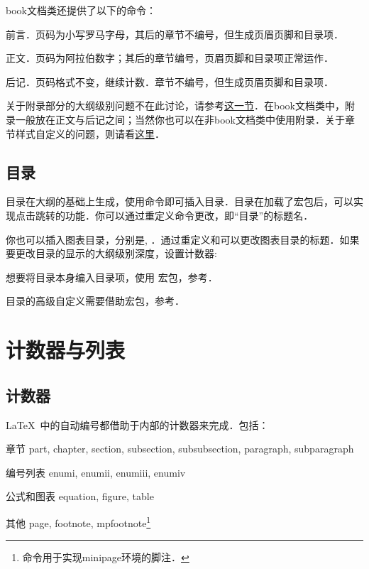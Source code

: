 book文档类还提供了以下的命令：
\begin{para}
\item[\latexline{frontmatter}] 前言．页码为小写罗马字母，其后的章节不编号，但生成页眉页脚和目录项．
\item[\latexline{mainmatter}] 正文．页码为阿拉伯数字；其后的章节编号，页眉页脚和目录项正常运作．
\item[\latexline{backmatter}] 后记．页码格式不变，继续计数．章节不编号，但生成页眉页脚和目录项．
\end{para}

关于附录部分的大纲级别问题不在此讨论，请参考\hyperref[sec:appendix]{这一节}．在book文档类中，附录一般放在正文与后记之间；当然你也可以在非book文档类中使用附录．关于章节样式自定义的问题，则请看\hyperref[sec:titlesec]{这里}．

\subsection{目录}
目录在大纲的基础上生成，使用命令即可插入目录．目录在加载了宏包后，可以实现点击跳转的功能．你可以通过重定义命令更改，即“目录”的标题名．
\begin{latex}
\renewcommand{\contensname}{目录}
\end{latex}

你也可以插入图表目录，分别是, ．通过重定义和可以更改图表目录的标题．如果要更改目录的显示的大纲级别深度，设置计数器:
\begin{latex}
\setcounter{tocdepth}{2} %
\end{latex}

想要将目录本身编入目录项，使用  宏包，参考\pageref{pkg:tocbibind}．

目录的高级自定义需要借助宏包，参考．

\section{计数器与列表}

\subsection{计数器}
\LaTeX\ 中的自动编号都借助于内部的计数器来完成．包括：
\begin{fead}
\item[章节] part, chapter, section, subsection, subsubsection, paragraph, subparagraph
\item[编号列表] enumi, enumii, enumiii, enumiv
\item[公式和图表] equation, figure, table
\item[其他] page, footnote, mpfootnote\footnote{命令用于实现minipage环境的脚注．}
\end{fead}

